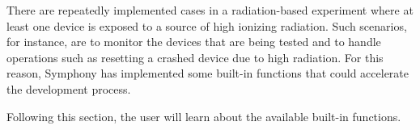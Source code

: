 There are repeatedly implemented cases in a radiation-based experiment where at least one device is exposed to a source of high ionizing radiation. Such scenarios, for instance, are to monitor the devices that are being tested and to handle operations such as resetting a crashed device due to high radiation. For this reason, Symphony has implemented some built-in functions that could accelerate the development process.

Following this section, the user will learn about the available built-in functions.